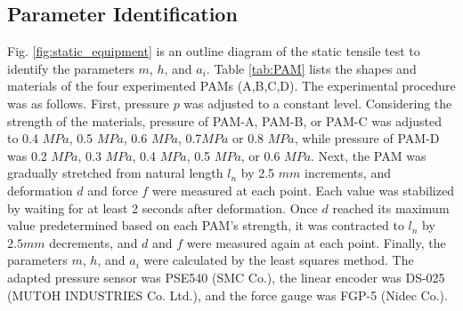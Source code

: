 \subsection{Parameter Identification}
Fig. \ref{fig:static_equipment} is an outline diagram of the static tensile test to identify the parameters $m$, $h$, and $a_i$.
Table \ref{tab:PAM} lists the shapes and materials of the four experimented PAMs (A,B,C,D).
The experimental procedure was as follows.
First, pressure $p$ was adjusted to a constant level.
Considering the strength of the materials, pressure of PAM-A, PAM-B, or PAM-C was adjusted to 0.4 $\si{MPa}$, 0.5 $\si{MPa}$, 0.6 $\si{MPa}$, 0.7$\si{MPa}$ or 0.8 $\si{MPa}$, while pressure of PAM-D was 0.2 $\si{MPa}$, 0.3 $\si{MPa}$, 0.4 $\si{MPa}$, 0.5 $\si{MPa}$, or 0.6 $\si{MPa}$.
Next, the PAM was gradually stretched from natural length $l_n$ by 2.5 $\si{mm}$ increments, and deformation $d$ and force $f$ were measured at each point.
Each value was stabilized by waiting for at least 2 seconds after deformation.
Once $d$ reached its maximum value predetermined based on each PAM's strength, it was contracted to $l_n$ by $2.5\si{mm}$ decrements, and $d$ and $f$ were measured again at each point.
Finally, the parameters $m$, $h$, and $a_i$ were calculated by the least squares method.
The adapted pressure sensor was PSE540 (SMC Co.), the linear encoder was DS-025 (MUTOH INDUSTRIES Co. Ltd.), and the force gauge was FGP-5 (Nidec Co.).

